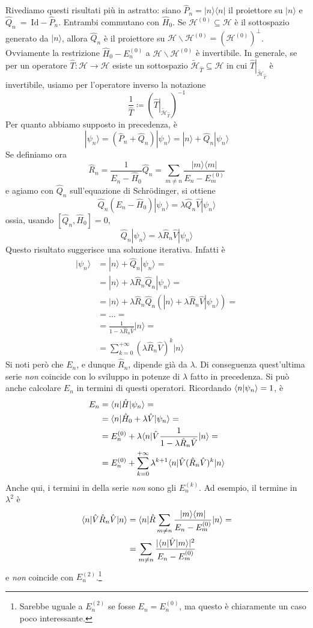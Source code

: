 \documentclass[a4paper, 11pt]{article}
\newcommand{\op}[1]{\hat{#1}}
\renewcommand{\H}{\mathcal{H}}
\newcommand{\id}{\mathrm{Id}}
\renewcommand{\op}[1]{\hat{#1}}
\newcommand{\ham}{\hat{H}}
\renewcommand{\ket}[1]{| #1\rangle}
\renewcommand{\bra}[1]{\langle #1|}
\begin{document}
Rivediamo questi risultati più in astratto: siano $\op P_n=\ket{n}\bra {n}$ il proiettore su $\ket{n}$ e $\op Q_n~=~\id-\op P_n$. Entrambi commutano con $\ham_0$. Se $\H^{(0)}\subseteq\H$ è il sottospazio generato da $\ket{n}$, allora $\op Q_n$ è il proiettore su $\H\backslash\H^{(0)}=(\H^{(0)})^\perp$. Ovviamente la restrizione $\ham_0-E_n^{(0)}$ a $\H\backslash\H^{(0)}$ è invertibile. In generale, se per un operatore $\op T\colon\H\to\H$ esiste un sottospazio $\tilde{\H}_{\op T}\subseteq\H$ in cui $\left.\op T\right|_{\tilde{\H}_{\op T}}$ è invertibile, usiamo per l'operatore inverso la notazione
\[\frac{1}{\op T}\coloneqq\left(\left.\op T\right|_{\tilde{\H}_{\op T}}\right)^{-1}\]
Per quanto abbiamo supposto in precedenza, è
\[\ket{\psi_n}=(\op P_n+\op Q_n)\ket{\psi_n}=\ket{n}+\op Q_n\ket{\psi_n}\]
Se definiamo ora
\[\op R_n=\frac{1}{E_n-\ham_0}\op Q_n=\sum_{m\neq n}\frac{\ket{m}\bra{m}}{E_n-E_m^{(0)}}\]
e agiamo con $\op Q_n$ sull'equazione di Schr\"odinger, si ottiene
\[\op Q_n(E_n-\ham_0)\ket{\psi_n}=\lambda\op Q_n\op V\ket{\psi_n}\]
ossia, usando $[\op Q_n,\ham_0]=0$,
\[\op Q_n\ket{\psi_n}=\lambda\op R_n\op V\ket{\psi_n}\]
Questo risultato suggerisce una soluzione iterativa. Infatti è
\begin{align*}
	\ket{\psi_n}&=\ket n+\op Q_n\ket{\psi_n}=\\&=\ket n+\lambda\op R_n\op Q_n\ket{\psi_n}=\\&=\ket{n}+\lambda\op R_n\op Q_n\left(\ket{n}+\lambda\op R_n\op V\ket{\psi_n}\right)=\\&=\dots=\\&=\frac{1}{1-\lambda\op R_n\op V}\ket{n}=\\&=\sum_{k=0}^{+\infty}(\lambda\op R_n\op V)^k\ket{n}
\end{align*}
Si noti però che $E_n$, e dunque $\op R_n$, dipende già da $\lambda$. Di conseguenza quest'ultima serie \emph{non} coincide con lo sviluppo in potenze di $\lambda$ fatto in precedenza. Si può anche calcolare $E_n$ in termini di questi operatori. Ricordando $\langle n\vert\psi_n\rangle=1$, è
\begin{align*}
	E_n&=\braketop{n}{\ham}{\psi_n}=\\&=\braketop{n}{\ham_0+\lambda\op V}{\psi_n}=\\&=E_n^{(0)}+\lambda\braketop{n}{\op V\frac{1}{1-\lambda\op R_n\op V}}{n}=\\&=E_n^{(0)}+\sum_{k=0}^{+\infty}\lambda^{k+1}\braketop{n}{\op V(\op R_n\op V)^k}{n}
\end{align*}
Anche qui, i termini in della serie \emph{non} sono gli $E_n^{(k)}$. Ad esempio, il termine in $\lambda^2$ è
\begin{align*}
	\braketop{n}{\op V\op R_n\op V}{n}&=\braketop{n}{\op R\sum_{m\neq n}\frac{\ket{m}\bra {m}}{E_n-E_m^{(0)}}}{n}=\\&=\sum_{m\neq n}\frac{|\braketop{n}{\op V}{m}|^2}{E_n-E_m^{(0)}}
\end{align*}
e \emph{non} coincide con $E_n^{(2)}$.\footnote{Sarebbe uguale a $E_n^{(2)}$ se fosse $E_n=E_n^{(0)}$, ma questo è chiaramente un caso poco interessante.}
\end{document}
